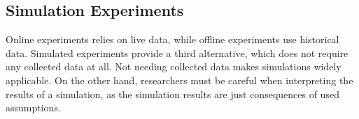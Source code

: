 %
%
%

\subsection{Simulation Experiments}

Online experiments relies on live data,
while offline experiments use historical data.
Simulated experiments provide a third alternative,
  which does not require any collected data at all.
Not needing collected data makes simulations widely applicable.
On the other hand, researchers must be careful when interpreting
  the results of a simulation, as the simulation results are %
  just consequences of used assumptions.


